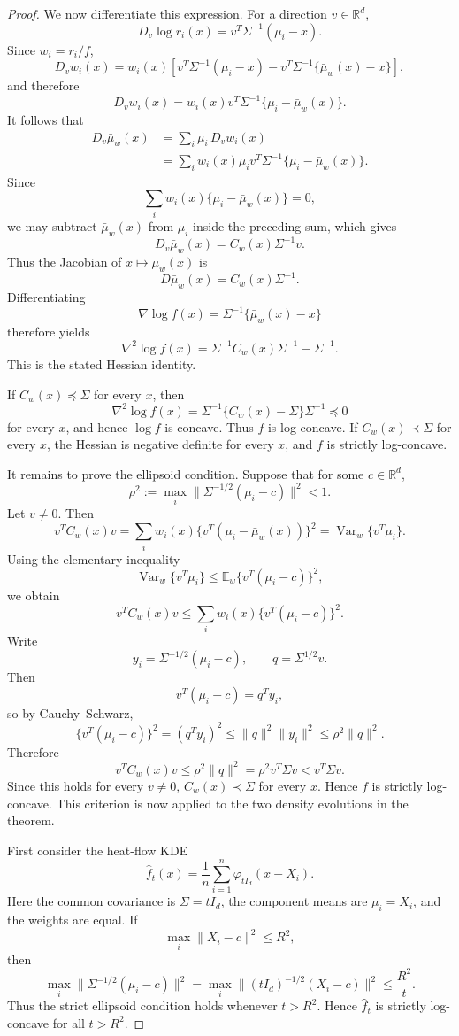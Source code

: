 \documentclass[preprint]{imsart}
\theoremstyle{plain}
\theoremstyle{definition}
\newcommand{\R}{\mathbb{R}}
\newcommand{\E}{\mathbb{E}}
\newcommand{\Var}{\operatorname{Var}}
\begin{document}
\begin{appendix}
\begin{proof}
We now differentiate this expression. For a direction \(v\in\R^d\),
\[
  D_v\log r_i(x)
  =
  v^T\Sigma^{-1}(\mu_i-x).
\]
Since \(w_i=r_i/f\),
\[
  D_v w_i(x)
  =
  w_i(x)
  \left[
    v^T\Sigma^{-1}(\mu_i-x)
    -
    v^T\Sigma^{-1}\{\bar\mu_w(x)-x\}
  \right],
\]
and therefore
\[
  D_v w_i(x)
  =
  w_i(x)v^T\Sigma^{-1}\{\mu_i-\bar\mu_w(x)\}.
\]
It follows that
\begin{align*}
  D_v\bar\mu_w(x)
  &=
  \sum_i \mu_i\,D_vw_i(x)  \\
  &=
  \sum_i w_i(x)\mu_i
  v^T\Sigma^{-1}\{\mu_i-\bar\mu_w(x)\}.
\end{align*}
Since
\[
  \sum_i w_i(x)\{\mu_i-\bar\mu_w(x)\}=0,
\]
we may subtract \(\bar\mu_w(x)\) from \(\mu_i\) inside the preceding sum,
which gives
\[
  D_v\bar\mu_w(x)
  =
  C_w(x)\Sigma^{-1}v.
\]
Thus the Jacobian of \(x\mapsto\bar\mu_w(x)\) is
\[
  D\bar\mu_w(x)=C_w(x)\Sigma^{-1}.
\]
Differentiating
\[
  \nabla\log f(x)=\Sigma^{-1}\{\bar\mu_w(x)-x\}
\]
therefore yields
\[
  \nabla^2\log f(x)
  =
  \Sigma^{-1}C_w(x)\Sigma^{-1}-\Sigma^{-1}.
\]
This is the stated Hessian identity.

If \(C_w(x)\preceq \Sigma\) for every \(x\), then
\[
  \nabla^2\log f(x)
  =
  \Sigma^{-1}\{C_w(x)-\Sigma\}\Sigma^{-1}
  \preceq 0
\]
for every \(x\), and hence \(\log f\) is concave. Thus \(f\) is
log-concave. If \(C_w(x)\prec\Sigma\) for every \(x\), the Hessian is
negative definite for every \(x\), and \(f\) is strictly log-concave.

It remains to prove the ellipsoid condition. Suppose that for some
\(c\in\R^d\),
\[
  \rho^2:=\max_i\|\Sigma^{-1/2}(\mu_i-c)\|^2<1.
\]
Let \(v\neq0\). Then
\[
  v^TC_w(x)v
  =
  \sum_i w_i(x)
  \{v^T(\mu_i-\bar\mu_w(x))\}^2
  =
  \Var_w\{v^T\mu_i\}.
\]
Using the elementary inequality
\[
  \Var_w\{v^T\mu_i\}
  \le
  \E_w\{v^T(\mu_i-c)\}^2,
\]
we obtain
\[
  v^TC_w(x)v
  \le
  \sum_i w_i(x)\{v^T(\mu_i-c)\}^2.
\]
Write
\[
  y_i=\Sigma^{-1/2}(\mu_i-c),
  \qquad
  q=\Sigma^{1/2}v.
\]
Then
\[
  v^T(\mu_i-c)=q^Ty_i,
\]
so by Cauchy--Schwarz,
\[
  \{v^T(\mu_i-c)\}^2
  =
  (q^Ty_i)^2
  \le
  \|q\|^2\|y_i\|^2
  \le
  \rho^2\|q\|^2.
\]
Therefore
\[
  v^TC_w(x)v
  \le
  \rho^2\|q\|^2
  =
  \rho^2 v^T\Sigma v
  <
  v^T\Sigma v.
\]
Since this holds for every \(v\neq0\), \(C_w(x)\prec\Sigma\) for every
\(x\). Hence \(f\) is strictly log-concave. This criterion is now applied to the two density evolutions in the theorem.

First consider the heat-flow KDE
\[
  \widehat f_t(x)=\frac1n\sum_{i=1}^n\varphi_{tI_d}(x-X_i).
\]
Here the common covariance is \(\Sigma=tI_d\), the component means are
\(\mu_i=X_i\), and the weights are equal. If
\[
  \max_i\|X_i-c\|^2\le R^2,
\]
then
\[
  \max_i\|\Sigma^{-1/2}(\mu_i-c)\|^2
  =
  \max_i\|(tI_d)^{-1/2}(X_i-c)\|^2
  \le
  \frac{R^2}{t}.
\]
Thus the strict ellipsoid condition holds whenever \(t>R^2\). Hence
\(\widehat f_t\) is strictly log-concave for all \(t>R^2\).


\end{proof}
\end{appendix}
\end{document}
